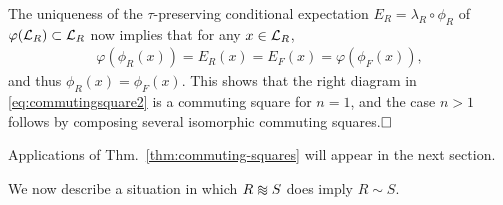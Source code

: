 \documentclass[12pt,a4paper]{amsart}
\numberwithin{equation}{section}
\theoremstyle{remark}
\newcommand{\la}{\lambda}
\def\apeqA{\SavedStyle\sim}
\def\Msim{\setstackgap{L}{\dimexpr.5pt+1.5\LMpt}\ensurestackMath{%
  \ThisStyle{\mathrel{\Centerstack{{\apeqA} {\apeqA} {\apeqA}}}}}}
\begin{document}
	The uniqueness of the $\tau$-preserving conditional expectation $E_R=\la_R\circ\phi_R$ of $\varphi(\mathcal{L}_R)\subset\mathcal{L}_R$ now implies that for any $x\in\mathcal{L}_R$,
	\begin{align*}
		\varphi(\phi_R(x))=E_R(x)=E_F(x)=\varphi(\phi_F(x)),
	\end{align*}
	and thus $\phi_R(x)=\phi_F(x)$. This shows that the right diagram in \eqref{eq:commutingsquare2} is a commuting square for $n=1$, and the case $n>1$ follows by composing several isomorphic commuting squares.$\hfill\square$

\medskip

Applications of Thm.~\ref{thm:commuting-squares} will appear in the next section.


We now describe a situation in which $R\Msim S$ does imply $R\sim S$. 
\end{document}
